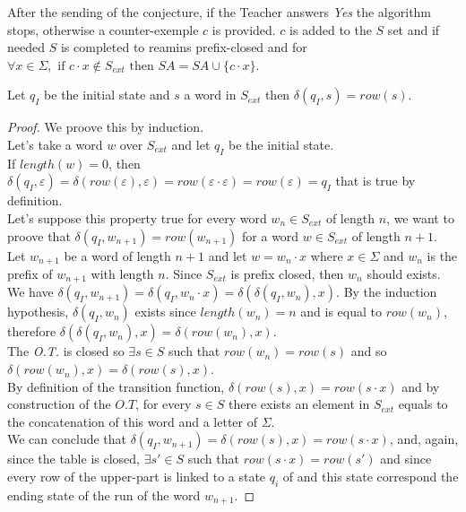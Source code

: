 After the sending of the conjecture, if the Teacher answers \textit{Yes} the algorithm stops, otherwise a counter-exemple $c$ is provided. $c$ is added to the $S$ set and if needed $S$ is completed to reamins prefix-closed and for $\forall x \in \Sigma, \text{ if } c \cdot x \notin S_{ext}  \text{ then } SA = SA \cup \{c \cdot x\}$.

\begin{lemma}
  \label{lemma:L_trans_from_QI}
  Let $q_I$ be the initial state and $s $ a word in $S_{ext}$ then $\delta(q_I, s) = row(s)$.
\end{lemma}

\begin{proof}
  We proove this by induction.\\
  Let's take a word $w$ over $S_{ext}$ and let $q_I$ be the initial state. \\
  If $length(w) = 0$, then $\delta(q_I, \varepsilon) = \delta(row(\varepsilon), \varepsilon) =  row(\varepsilon \cdot \varepsilon) = row(\varepsilon) = q_I$ that is true by definition.\\
  Let's suppose this property true for every word $w_n \in S_{ext}$ of length $n$, we want to proove that $\delta(q_I, w_{n+1}) = row(w_{n+1})$ for a word $w \in S_{ext}$ of length $n+1$.\\
  Let $w_{n+1}$ be a word of length $n+1$ and let $w = w_n \cdot x$ where $x \in \Sigma$ and $w_n$ is the prefix of $w_{n+1}$ with length $n$. Since $S_{ext}$ is prefix closed, then $w_n$ should exists.\\
  We have $\delta(q_I, w_{n+1}) = \delta(q_I, w_n \cdot x) = \delta(\delta(q_I, w_n), x)$. By the induction hypothesis, $\delta(q_I, w_n)$ exists since $length(w_n) = n$ and is equal to $row(w_n)$, therefore $\delta(\delta(q_I, w_n), x) = \delta(row(w_n), x)$. \\
  The \textit{O.T.} is closed so $\exists s \in S$ such that $row(w_n) = row(s)$ and so $\delta(row(w_n), x) = \delta(row(s), x)$.\\
  By definition of the transition function, $\delta(row(s), x) = row(s \cdot x)$ and by construction of the $O.T$, for every $s \in S$ there exists an element in $S_{ext}$ equals to the concatenation of this word and a letter of $\Sigma$.\\
  We can conclude that $\delta(q_I, w_{n+1}) = \delta(row(s), x) = row(s \cdot x)$, and, again, since the table is closed, $\exists s' \in S$ such that $row(s \cdot x) = row(s')$ and since every row of the upper-part is linked to a state $q_i$ of \automaton{} and this state correspond the ending state of the run of the word $w_{n+1}$.
\end{proof}

